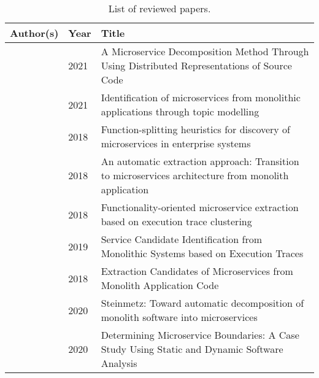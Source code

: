 \begin{table}[ht]
    \footnotesize
    \caption[List of reviewed papers]{List of reviewed papers.}\label{tab:reviewed_papers}
    \begin{tabular}{>{\raggedright}m{75pt} >{\raggedright}m{20pt} >{\raggedright\arraybackslash}m{230pt}}
        \toprule
        \textbf{Author(s)}
        & \textbf{Year}
        & \textbf{Title} \\
        \midrule
        \citeauthor{al2021microservice} \cite{al2021microservice}
        & 2021
        & A Microservice Decomposition Method Through Using Distributed Representations of Source Code \\
        \midrule
        \citeauthor{brito2021identification} \cite{brito2021identification}
        & 2021
        & Identification of microservices from monolithic applications through topic modelling \\
        \midrule
        \citeauthor{de2018function} \cite{de2018function}
        & 2018
        & Function-splitting heuristics for discovery of microservices in enterprise systems \\
        \midrule
        \citeauthor{eski2018automatic} \cite{eski2018automatic}
        & 2018
        & An automatic extraction approach: Transition to microservices architecture from monolith application \\
        \midrule
        \citeauthor{jin2018functionality} \cite{jin2018functionality}
        & 2018
        & Functionality-oriented microservice extraction based on execution trace clustering \\
        \midrule
        \citeauthor{jin2019service} \cite{jin2019service}
        & 2019
        & Service Candidate Identification from Monolithic Systems based on Execution Traces \\
        \midrule
        \citeauthor{kamimura2018extracting} \cite{kamimura2018extracting}
        & 2018
        & Extraction Candidates of Microservices from Monolith Application Code \\
        \midrule
        \citeauthor{lohnertz2020steinmetz} \cite{lohnertz2020steinmetz}
        & 2020
        & Steinmetz: Toward automatic decomposition of monolith software into microservices \\
        \midrule
        \citeauthor{matias2020determining} \cite{matias2020determining}
        & 2020
        & Determining Microservice Boundaries: A Case Study Using Static and Dynamic Software Analysis \\
        \midrule

\end{tabular}
\end{table}
